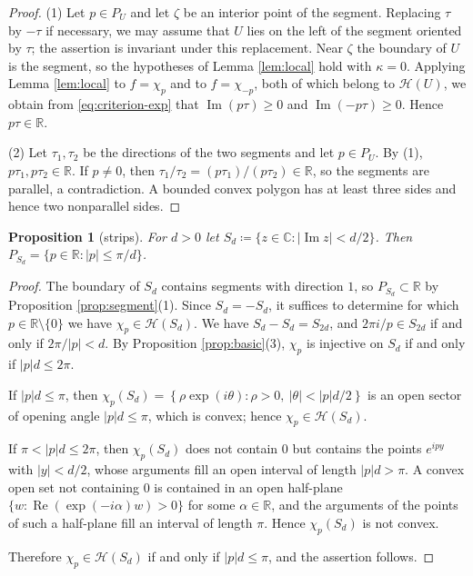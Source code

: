 \documentclass[a4paper, reqno, 11pt]{amsart}
\newtheorem{Prop}[Thm]{Proposition}
\theoremstyle{definition}
\begin{document}
\begin{proof}
(1) Let $p \in P_U$ and let $\zeta$ be an interior point of the segment.
Replacing $\tau$ by $-\tau$ if necessary, we may assume that $U$ lies on the left of the segment oriented by $\tau$; the assertion is invariant under this replacement.
Near $\zeta$ the boundary of $U$ is the segment, so the hypotheses of Lemma \ref{lem:local} hold with $\kappa = 0$.
Applying Lemma \ref{lem:local} to $f = \chi_p$ and to $f = \chi_{-p}$, both of which belong to $\mathcal{H}(U)$, we obtain from \eqref{eq:criterion-exp} that $\operatorname{Im}(p\tau) \ge  0$ and $\operatorname{Im}(-p\tau) \ge  0$.
Hence $p\tau \in \mathbb{R}$.

(2) Let $\tau_1, \tau_2$ be the directions of the two segments and let $p \in P_U$.
By (1), $p\tau_1, p\tau_2 \in \mathbb{R}$.
If $p \neq 0$, then $\tau_1/\tau_2 = (p\tau_1)/(p\tau_2) \in \mathbb{R}$, so the segments are parallel, a contradiction.
A bounded convex polygon has at least three sides and hence two nonparallel sides.
\end{proof}



\begin{Prop}[strips]\label{prop:strip}
For $d > 0$ let $S_d \coloneqq  \{ z \in \mathbb{C} : |\operatorname{Im} z| < d/2 \}$.
Then $P_{S_d} = \{ p \in \mathbb{R} : |p| \le  \pi/d \}$.
\end{Prop}

\begin{proof}
The boundary of $S_d$ contains segments with direction $1$, so $P_{S_d} \subset \mathbb{R}$ by Proposition \ref{prop:segment}(1).
Since $S_d = -S_d$, it suffices to determine for which $p \in \mathbb{R}\setminus\{0\}$ we have $\chi_p \in \mathcal{H}(S_d)$.
We have $S_d - S_d = S_{2d}$, and $2\pi i/p \in S_{2d}$ if and only if $2\pi/|p| < d$.
By Proposition \ref{prop:basic}(3), $\chi_p$ is injective on $S_d$ if and only if $|p| d \le  2\pi$.

If $|p| d \le  \pi$, then $\chi_p(S_d) = \left\{ \rho \exp(i\theta) : \rho > 0, \ |\theta| < |p| d/2 \right\}$ is an open sector of opening angle $|p| d \le  \pi$, which is convex; hence $\chi_p \in \mathcal{H}(S_d)$.

If $\pi < |p| d \le  2\pi$, then $\chi_p(S_d)$ does not contain $0$ but contains the points $e^{ipy}$ with $|y| < d/2$, whose arguments fill an open interval of length $|p|d > \pi$.
A convex open set not containing $0$ is contained in an open half-plane $\{ w : \operatorname{Re}(\exp(-i\alpha) w) > 0 \}$ for some $\alpha \in \mathbb{R}$, and the arguments of the points of such a half-plane fill an interval of length $\pi$.
Hence $\chi_p (S_d)$ is not convex.

Therefore $\chi_p \in \mathcal{H}(S_d)$ if and only if $|p| d \le  \pi$, and the assertion follows.
\end{proof}
\end{document}

